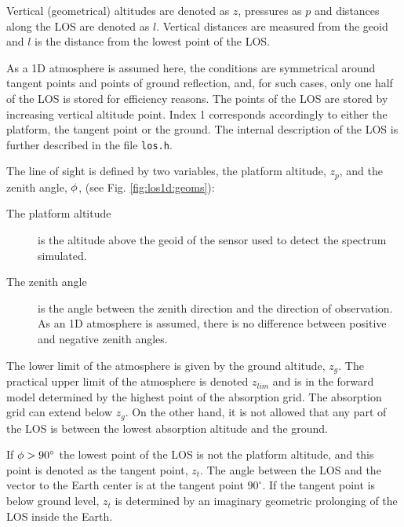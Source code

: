  \label{sec:los:defs}
 
 Vertical (geometrical) altitudes are denoted as $z$, pressures as $p$
 and distances along the LOS are denoted as $l$. Vertical distances
 are measured from the geoid and $l$ is the distance from the lowest
 point of the LOS.
 
 As a 1D atmosphere is assumed here, the conditions are symmetrical
 around tangent points and points of ground reflection, and, for such
 cases, only one half of the LOS is stored for efficiency reasons.
 The points of the LOS are stored by increasing vertical altitude
 point. Index 1 corresponds accordingly to either the platform, the
 tangent point or the ground.  The internal description of the LOS is
 further described in the file \verb|los.h|.
  
 The line of sight is defined by two variables, the platform altitude,
 $z_p$, and the zenith angle, $\phi$, (see Fig. \ref{fig:los1d:geoms}):

 \begin{description}
  \item[The platform altitude] is the altitude above the geoid of the
       sensor used to detect the spectrum simulated.
  \item[The zenith angle] is the angle between the zenith
       direction and the direction of observation. As an 1D atmosphere is
       assumed, there is no difference between positive and negative
       zenith angles.
  \end{description}

  \noindent
  The lower limit of the atmosphere is given by the ground altitude,
  $z_g$. The practical upper limit of the atmosphere is denoted
  $z_{lim}$ and is in the forward model determined by the highest
  point of the absorption grid. The absorption grid can
  extend below $z_g$. On the other hand, it is not allowed that any
  part of the LOS is between the lowest absorption altitude and the ground.
 
  If $\phi>90^{\circ}$ the lowest point of the LOS is not the platform
  altitude, and this point is denoted as the tangent point, $z_t$. The
  angle between the LOS and the vector to the Earth center is at the
  tangent point $90^\circ$. If the tangent point is below ground
  level, $z_t$ is determined by an imaginary geometric prolonging of
  the LOS inside the Earth.

